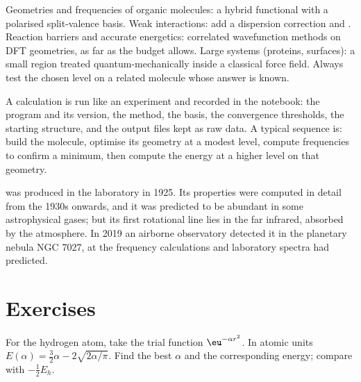 \begin{method}\label{met:b3:computational-chemistry:choose-level}
Geometries and frequencies of organic molecules: a hybrid functional with a
polarised split-valence basis. Weak interactions: add a dispersion
correction and . Reaction barriers and accurate
energetics: correlated wavefunction methods on DFT geometries, as far as the
budget allows. Large systems (proteins, surfaces): a small region treated
quantum-mechanically inside a classical force field. Always test the chosen
level on a related molecule whose answer is known.
\end{method}

\begin{inthelab}
A calculation is run like an experiment and recorded in the notebook: the
program and its version, the method, the basis, the convergence thresholds,
the starting structure, and the output files kept as raw data. A typical
sequence is: build the molecule, optimise its geometry at a modest level,
compute frequencies to confirm a minimum, then compute the energy at a
higher level on that geometry.
\end{inthelab}

\begin{history}
 was produced in the laboratory in 1925. Its properties were computed
in detail from the 1930s onwards, and it was predicted to be abundant in
some astrophysical gases; but its first rotational line lies in the far
infrared, absorbed by the atmosphere. In 2019 an airborne observatory
detected it in the planetary nebula NGC 7027, at the frequency calculations
and laboratory spectra had predicted.
\end{history}

\section{Exercises}

\begin{exercise}[$\star$]\label{exo:b3:computational-chemistry:1}
For the hydrogen atom, take the trial function $\eu^{-\alpha r^2}$. In atomic
units $E(\alpha) = \frac32\alpha - 2\sqrt{2\alpha/\pi}$. Find the best $\alpha$ and
the corresponding energy; compare with $-\frac12E_h$.
\end{exercise}

